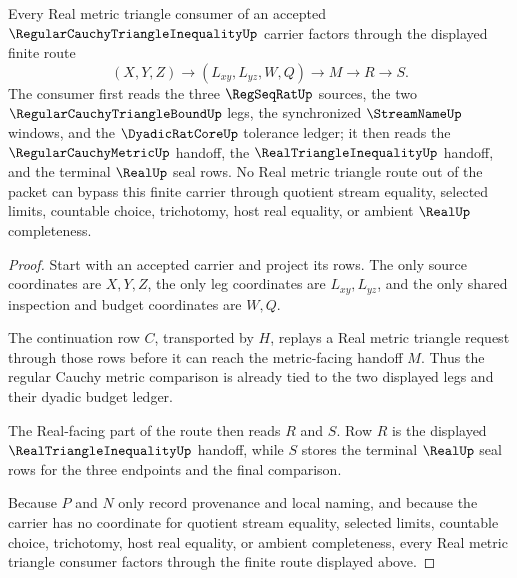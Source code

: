 \begin{theorem}
\label{thm:regular-cauchy-triangle-inequality-real-metric-route}
Every Real metric triangle consumer of an accepted $\RegularCauchyTriangleInequalityUp$ carrier factors through the displayed finite route
$$
(X,Y,Z) \longrightarrow (L_{xy},L_{yz},W,Q) \longrightarrow M \longrightarrow R \longrightarrow S.
$$
The consumer first reads the three $\RegSeqRatUp$ sources, the two $\RegularCauchyTriangleBoundUp$ legs, the synchronized $\StreamNameUp$ windows, and the $\DyadicRatCoreUp$ tolerance ledger; it then reads the $\RegularCauchyMetricUp$ handoff, the $\RealTriangleInequalityUp$ handoff, and the terminal $\RealUp$ seal rows. No Real metric triangle route out of the packet can bypass this finite carrier through quotient stream equality, selected limits, countable choice, trichotomy, host real equality, or ambient $\RealUp$ completeness.
\end{theorem}
\begin{proof}
Start with an accepted carrier and project its rows. The only source coordinates are $X,Y,Z$, the only leg coordinates are $L_{xy},L_{yz}$, and the only shared inspection and budget coordinates are $W,Q$.

The continuation row $C$, transported by $H$, replays a Real metric triangle request through those rows before it can reach the metric-facing handoff $M$. Thus the regular Cauchy metric comparison is already tied to the two displayed legs and their dyadic budget ledger.

The Real-facing part of the route then reads $R$ and $S$. Row $R$ is the displayed $\RealTriangleInequalityUp$ handoff, while $S$ stores the terminal $\RealUp$ seal rows for the three endpoints and the final comparison.

Because $P$ and $N$ only record provenance and local naming, and because the carrier has no coordinate for quotient stream equality, selected limits, countable choice, trichotomy, host real equality, or ambient completeness, every Real metric triangle consumer factors through the finite route displayed above.
\end{proof}


